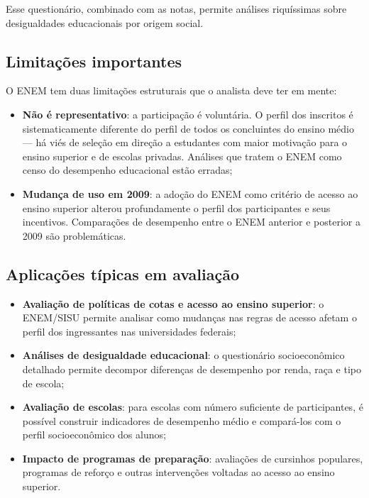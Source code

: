 Esse questionário, combinado com as notas, permite análises riquíssimas sobre desigualdades educacionais por origem social.

\subsection{Limitações importantes}

O ENEM tem duas limitações estruturais que o analista deve ter em mente:

\begin{itemize}
  \item \textbf{Não é representativo}: a participação é voluntária. O perfil dos inscritos é sistematicamente diferente do perfil de todos os concluintes do ensino médio — há viés de seleção em direção a estudantes com maior motivação para o ensino superior e de escolas privadas. Análises que tratem o ENEM como censo do desempenho educacional estão erradas;

  \item \textbf{Mudança de uso em 2009}: a adoção do ENEM como critério de acesso ao ensino superior alterou profundamente o perfil dos participantes e seus incentivos. Comparações de desempenho entre o ENEM anterior e posterior a 2009 são problemáticas.
\end{itemize}

\subsection{Aplicações típicas em avaliação}

\begin{itemize}
  \item \textbf{Avaliação de políticas de cotas e acesso ao ensino superior}: o ENEM/SISU permite analisar como mudanças nas regras de acesso afetam o perfil dos ingressantes nas universidades federais;
  \item \textbf{Análises de desigualdade educacional}: o questionário socioeconômico detalhado permite decompor diferenças de desempenho por renda, raça e tipo de escola;
  \item \textbf{Avaliação de escolas}: para escolas com número suficiente de participantes, é possível construir indicadores de desempenho médio e compará-los com o perfil socioeconômico dos alunos;
  \item \textbf{Impacto de programas de preparação}: avaliações de cursinhos populares, programas de reforço e outras intervenções voltadas ao acesso ao ensino superior.
\end{itemize}

